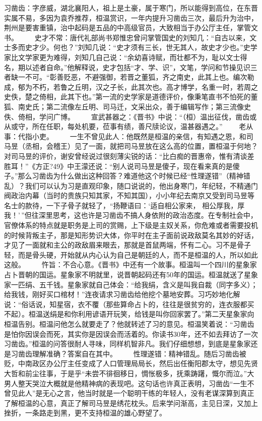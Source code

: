 \documentclass[]{book}
\begin{document}
习凿齿：字彦威，湖北襄阳人，祖上是土豪，属于寒门，所以能得到高位，在东晋实属不易，多因为袁乔推荐，桓温赏识，一年内提升习凿齿三次，最后升为治中，荆州是要害重镇，治中起码是五品的中高级官员，大致相当于办公厅主任，掌管文书。
　　史才不常：唐代礼部尚书郑惟忠曾问掌管国史的刘知几：``自古以来，文士多而史才少。何也？''刘知几说：``史才须有三长，世无其人，故史才少也。''史学家比文学家更为难得，刘知几自己说：``余幼喜诗赋，而壮都不为，耻以文士得名，期以述者自命。''他解释说，史才包括``才、学、识''，文笔，学问和节操见识三者缺一不可。``彰善贬恶，不避强御，若晋之董狐，齐之南史，此其上也。编次勒成，郁为不朽，若鲁之丘明，汉之子长，此其次也。高才博学，名重一时，若周之史佚，楚之倚相，此其下也。''第一流的史学家是道德评价，像秉笔直书不怕死的董狐、南史氏；第二流像左丘明、司马迁，文采出众，善于编辑写作；第三流像史佚、倚相，学问广博。
　　宣武甚器之：《晋书》中说：``（桓）温出征伐，凿齿或从或守，所在任职，每处机要，莅事有绩，善尺牍论议，温甚器遇之。''
　　老从事：代指小吏。
　　一生不曾见此人：他既然是桓温的亲信，有知遇之恩，和司马昱（丞相，会稽王）见了一面，就把司马昱放在这么高的位置，置桓温于何地？对司马昱的评价，谢安曾经说过很刻薄尖锐的话：``比白痴的晋惠帝，惟有清谈差胜耳！''《方正?49》中王濛还说：``别人说司马昱是傻子，现在看来真的是傻子。''那么习凿齿为什么做出这种回答？难道他这个时候已经``性理遂错''（精神错乱）？我们可以认为习是直观印象，随口说说的，他出身寒门，年纪轻，不精通门阀政治内幕（当时的贵族只知其家，不知其国），小小年纪去南京又受到司马昱等名士的款待，一下子骨子就轻了，``扬鞭语曰：`适自相公家来，
相公厚我，厚我！'\,''但往深里思考，这也许是习凿齿不搞人身依附的政治态度。在专制社会中，官僚体系的特点就是职务是上司的赏赐，上下级是主奴关系，你危难或者需要投机的时候背叛主子，那是知形势识大体，你平时在主子面前说政敌莫名其妙的好话，才见了一面就和主公的政敌眉来眼去，那就是首鼠两端，怀有二心。习不是骨子轻，而是骨头硬，开始就从内心认为自己是朝廷的人，而不是桓温的人，所以如此这般。
　　忤旨：不合心意。《晋书》中还有一个故事。桓温叫一个四川的星象家占卜晋朝的国运。星象家不明就里，说晋朝起码还有50年的国运。桓温就送了星象家一匹绢、五千钱。星象家就自己体会：``给我绢，含义是叫我自裁（同字多义）；给我钱，刚好买口棺材！''连夜请求习凿齿给他挖个墓地安葬。习巧妙地化解说：``俗话说，知星宿，衣不覆（那些算命占卜的，往往是很贫穷的，连衣服都买不起）。桓温送绢是和你利用谚语开玩笑，给钱是叫你回家罢了。''第二天星象家向桓温告别。桓温问他怎么就要走了？他就转述了习的意见。桓温笑着说：``习凿齿是怕你因误会而死，其实你是因误会而活着的。你读书30年，还不如去拜访了一次习凿齿。''桓温的问答很耐人寻味，同样机智非凡。我们仔细想想，到底是星象家还是习凿齿理解准确？答案自在其中。
　　性理遂错：精神错乱。随后习凿齿被贬，中南政区办公厅主任变成了人口管理局局长，然后出任衡阳郡太守，想见先贤大哲和前尘往事，于是乎``未尝不徘徊移日，惆怅极多，抚乘踌躇，慨尔而泣。''大男人整天哭泣大概就是他精神病的表现吧。这句话也许真正表明，习凿齿``一生不曾见此人''是无心之言，他当时就是一个聪明干练的年轻人，没有老谋深算到真正了解桓温的心意，真正了解司马昱是绣花枕头。后来学问渐高，主见日深，又加上挫折，一条路走到黑，更不支持桓温的雄心野望了。
\end{document}
